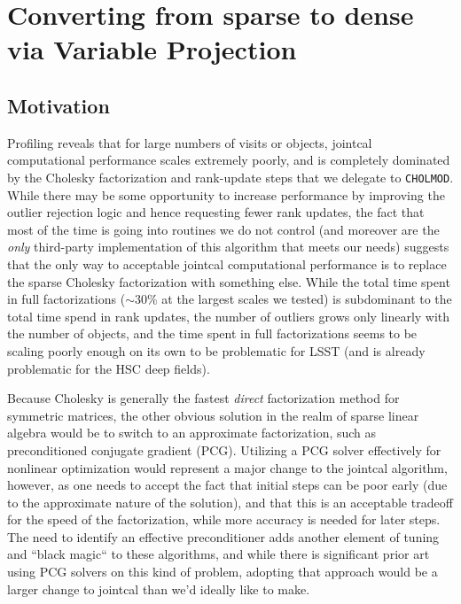 \section{Converting from sparse to dense via Variable Projection}

\subsection{Motivation}

Profiling reveals that for large numbers of visits or objects, jointcal computational performance scales extremely poorly, and is completely dominated by the Cholesky factorization and rank-update steps that we delegate to \texttt{CHOLMOD}.
While there may be some opportunity to increase performance by improving the outlier rejection logic and hence requesting fewer rank updates, the fact that most of the time is going into routines we do not control (and moreover are the \emph{only} third-party implementation of this algorithm that meets our needs) suggests that the only way to acceptable jointcal computational performance is to replace the sparse Cholesky factorization with something else.
While the total time spent in full factorizations ($\sim 30\%$ at the largest scales we tested) is subdominant to the total time spend in rank updates, the number of outliers grows only linearly with the number of objects, and the time spent in full factorizations seems to be scaling poorly enough on its own to be problematic for LSST (and is already problematic for the HSC deep fields).

Because Cholesky is generally the fastest \emph{direct} factorization method for symmetric matrices, the other obvious solution in the realm of sparse linear algebra would be to switch to an approximate factorization, such as preconditioned conjugate gradient (PCG).
Utilizing a PCG solver effectively for nonlinear optimization would represent a major change to the jointcal algorithm, however, as one needs to accept the fact that initial steps can be poor early (due to the approximate nature of the solution), and that this is an acceptable tradeoff for the speed of the factorization, while more accuracy is needed for later steps.
The need to identify an effective preconditioner adds another element of tuning and ``black magic`` to these algorithms, and while there is significant prior art using PCG solvers on this kind of problem, adopting that approach would be a larger change to jointcal than we'd ideally like to make.

